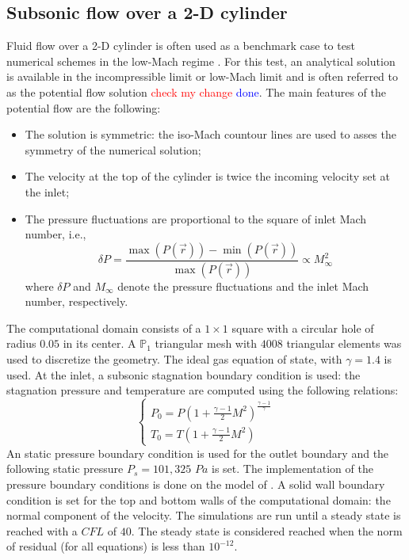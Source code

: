 \documentclass[preprint,10pt]{elsarticle}
\newcommand{\tcr}[1]{\textcolor{red}{#1}}
\newcommand{\tcb}[1]{\textcolor{blue}{#1}}
\begin{document}
\subsection{Subsonic flow over a 2-D cylinder} \label{sec:cylinder}

Fluid flow over a 2-D cylinder is often used as a benchmark case to test numerical schemes in the low-Mach regime \cite{LowMach1, LowMach2, LowMach3}. For this test, an analytical solution is available in the incompressible limit or low-Mach limit and is often referred to as the potential flow solution \tcr{check my change} \tcb{done}. The main features of the potential flow are the following:
%
\begin{itemize}
\item The solution is symmetric: the iso-Mach countour lines are used to asses the symmetry of the numerical solution;
\item The velocity at the top of the cylinder is twice the incoming velocity set at the inlet;
\item The pressure fluctuations are proportional to the square of inlet Mach number, i.e., 
\begin{equation}
\delta P = \frac{\max(P(\vec{r})) - \min(P(\vec{r}))}{\max(P(\vec{r}))}  \propto M_\infty^2
\end{equation}
where $\delta P$ and $M_\infty$ denote the pressure fluctuations and the inlet Mach number, respectively.
\end{itemize}
%
The computational domain consists of a $1\times 1$ square with a circular hole of radius $0.05$ in its center. A $\mathbb{P}_1$ triangular mesh with $4008$ triangular elements was used to discretize the geometry. The ideal gas equation of state, with $\gamma=1.4$ is used. At the inlet, a subsonic stagnation boundary condition is used: the stagnation pressure and temperature are computed using the following relations:
%
\begin{equation}
\label{eq:stagnation_relations}
\left\{
\begin{array}{l}
P_0 = P\left( 1 + \frac{\gamma-1}{2} M^2 \right)^{\frac{\gamma-1}{\gamma}} \\
T_0 = T\left( 1 + \frac{\gamma-1}{2} M^2 \right)
\end{array}
\right.
\end{equation}
%
An static pressure boundary condition is used for the outlet boundary and the following static pressure $P_s = 101,325$ $Pa$ is set. The implementation of the pressure boundary conditions is done on the model of \cite{SEM}. A solid wall boundary condition is set for the top and bottom walls of the computational domain: the normal component of the velocity. The simulations are run until a steady state is reached with a $CFL$ of $40$. The steady state is considered reached when the norm of residual (for all equations) is less than $10^{-12}$.
\end{document}
